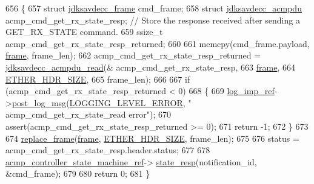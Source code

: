 \begin{DoxyCode}
656 \{
657     \textcolor{keyword}{struct }\hyperlink{structjdksavdecc__frame}{jdksavdecc\_frame} cmd\_frame;
658     \textcolor{keyword}{struct }\hyperlink{structjdksavdecc__acmpdu}{jdksavdecc\_acmpdu} acmp\_cmd\_get\_rx\_state\_resp; \textcolor{comment}{// Store the response received
       after sending a GET\_RX\_STATE command.}
659     ssize\_t acmp\_cmd\_get\_rx\_state\_resp\_returned;
660 
661     memcpy(cmd\_frame.payload, \hyperlink{gst__avb__playbin_8c_ac8e710e0b5e994c0545d75d69868c6f0}{frame}, frame\_len);
662     acmp\_cmd\_get\_rx\_state\_resp\_returned = \hyperlink{group__acmpdu_gaf49dbf727e31865dd891330cbdeeabc2}{jdksavdecc\_acmpdu\_read}(&
      acmp\_cmd\_get\_rx\_state\_resp,
663                                                                  \hyperlink{gst__avb__playbin_8c_ac8e710e0b5e994c0545d75d69868c6f0}{frame},
664                                                                  \hyperlink{namespaceavdecc__lib_a6c827b1a0d973e18119c5e3da518e65ca9512ad9b34302ba7048d88197e0a2dc0}{ETHER\_HDR\_SIZE},
665                                                                  frame\_len);
666 
667     \textcolor{keywordflow}{if} (acmp\_cmd\_get\_rx\_state\_resp\_returned < 0)
668     \{
669         \hyperlink{namespaceavdecc__lib_acbe3e2a96ae6524943ca532c87a28529}{log\_imp\_ref}->\hyperlink{classavdecc__lib_1_1log_a68139a6297697e4ccebf36ccfd02e44a}{post\_log\_msg}(\hyperlink{namespaceavdecc__lib_a501055c431e6872ef46f252ad13f85cdaf2c4481208273451a6f5c7bb9770ec8a}{LOGGING\_LEVEL\_ERROR}, \textcolor{stringliteral}{"
      acmp\_cmd\_get\_rx\_state\_read error"});
670         assert(acmp\_cmd\_get\_rx\_state\_resp\_returned >= 0);
671         \textcolor{keywordflow}{return} -1;
672     \}
673 
674     \hyperlink{classavdecc__lib_1_1descriptor__base__imp_a482fe95208e9e14885e28e73e7be2c49}{replace\_frame}(\hyperlink{gst__avb__playbin_8c_ac8e710e0b5e994c0545d75d69868c6f0}{frame}, \hyperlink{namespaceavdecc__lib_a6c827b1a0d973e18119c5e3da518e65ca9512ad9b34302ba7048d88197e0a2dc0}{ETHER\_HDR\_SIZE}, frame\_len);
675 
676     status = acmp\_cmd\_get\_rx\_state\_resp.header.status;
677 
678     \hyperlink{namespaceavdecc__lib_a693c2049de1d4ec860a92126b846ac21}{acmp\_controller\_state\_machine\_ref}->
      \hyperlink{classavdecc__lib_1_1acmp__controller__state__machine_affdd2e72c0e7a518e4b8993e23750aa9}{state\_resp}(notification\_id, &cmd\_frame);
679 
680     \textcolor{keywordflow}{return} 0;
681 \}
\end{DoxyCode}


